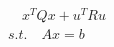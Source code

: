\documentclass[preview]{standalone}
\begin{document}
\begin{align*}
\quad x^TQx + u^T R u \\ s.t. \quad Ax = b
\end{align*}
\end{document}
